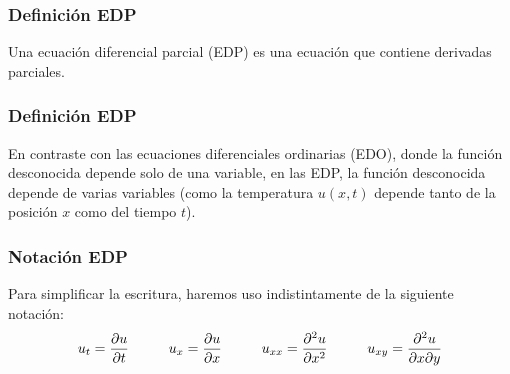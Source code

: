 \documentclass[12pt]{beamer}
\begin{document}
\begin{frame}
\frametitle{Definición EDP}
Una ecuación diferencial parcial (EDP) es una ecuación que contiene derivadas parciales. 
\end{frame}
\begin{frame}
\frametitle{Definición EDP}
En contraste con las ecuaciones diferenciales ordinarias (EDO), donde la función desconocida depende solo de una variable, \pause en las EDP, la función desconocida depende de varias variables (como la temperatura $u (x, t)$ depende tanto de la posición $x$ como del tiempo $t$).
\end{frame}
\begin{frame}
\frametitle{Notación EDP}
Para simplificar la escritura, haremos uso indistintamente de la siguiente notación:
\pause
\begin{align*}
u_{t} = \pdv{u}{t} \hspace{1cm} u_{x} = \pdv{u}{x} \hspace{1cm} u_{xx} = \pdv[2]{u}{x} \hspace{1cm} u_{xy} = \pdv[2]{u}{x}{y}
\end{align*}
\end{frame}
\end{document}
